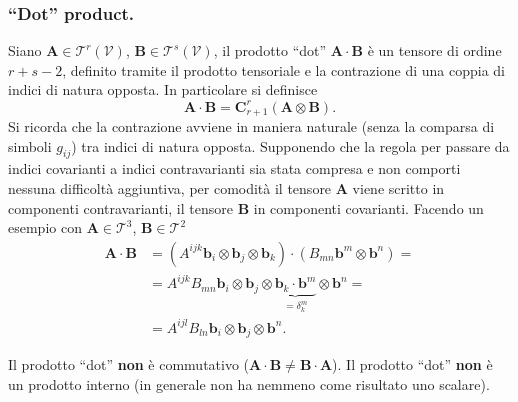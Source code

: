  \subsubsection{``Dot'' product.} Siano $\bm{A} \in \mathcal{T}^r(\mathcal{V})$, $\bm{B} \in \mathcal{T}^s(\mathcal{V})$, il
 prodotto ``dot'' $\bm{A} \cdot \bm{B}$ è un tensore di ordine $r+s-2$, definito tramite il prodotto tensoriale e la contrazione
 di una coppia di indici di natura opposta.
 In particolare si definisce 
 \begin{equation}
  \bm{A} \cdot \bm{B} = \bm{C}^{r}_{r+1} (\bm{A} \otimes \bm{B}) .
 \end{equation}
 Si ricorda che la contrazione avviene in maniera naturale (senza la comparsa di simboli $g_{ij}$) tra indici di natura opposta. Supponendo che la regola per passare da indici
 covarianti a indici contravarianti sia stata compresa e non comporti nessuna difficoltà aggiuntiva, per comodità il tensore
 $\bm{A}$ viene scritto in componenti contravarianti, il tensore $\bm{B}$ in componenti covarianti. Facendo un esempio con
 $\bm{A} \in \mathcal{T}^3$, $\bm{B} \in \mathcal{T}^2$
 \begin{equation}
 \begin{aligned}
  \bm{A} \cdot \bm{B} & = (A^{ijk} \bm{b}_i \otimes \bm{b}_j \otimes \bm{b}_k) \cdot (B_{mn} \bm{b}^m \otimes \bm{b}^n) = \\
     & = A^{ijk} B_{mn} \bm{b}_i \otimes \bm{b}_j \otimes \underbrace{\bm{b}_k \cdot \bm{b}^m}_{=\delta_k^m} \otimes \bm{b}^n = \\
   & = A^{ijl} B_{ln} \bm{b}_i \otimes \bm{b}_j \otimes \bm{b}^n .
 \end{aligned}
 \end{equation}
%
\begin{remark}
 Il prodotto ``dot'' \textbf{non} è commutativo ($\bm{A} \cdot \bm{B} \neq \bm{B} \cdot \bm{A}$).
 Il prodotto ``dot'' \textbf{non} è un prodotto interno (in generale non ha nemmeno come risultato uno scalare).
\end{remark}
 
